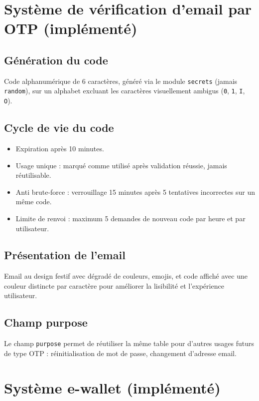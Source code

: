 \documentclass[11pt,a4paper]{article}
\begin{document}
\section{Système de vérification d'email par OTP (implémenté)}

\subsection{Génération du code}
Code alphanumérique de 6 caractères, généré via le module \texttt{secrets} (jamais \texttt{random}), sur un alphabet excluant les caractères visuellement ambigus (\texttt{0}, \texttt{1}, \texttt{I}, \texttt{O}).

\subsection{Cycle de vie du code}
\begin{itemize}[leftmargin=*]
    \item Expiration après 10 minutes.
    \item Usage unique : marqué comme utilisé après validation réussie, jamais réutilisable.
    \item Anti brute-force : verrouillage 15 minutes après 5 tentatives incorrectes sur un même code.
    \item Limite de renvoi : maximum 5 demandes de nouveau code par heure et par utilisateur.
\end{itemize}

\subsection{Présentation de l'email}
Email au design festif avec dégradé de couleurs, emojis, et code affiché avec une couleur distincte par caractère pour améliorer la lisibilité et l'expérience utilisateur.

\subsection{Champ purpose}
Le champ \texttt{purpose} permet de réutiliser la même table pour d'autres usages futurs de type OTP : réinitialisation de mot de passe, changement d'adresse email.

\section{Système e-wallet (implémenté)}
\end{document}
